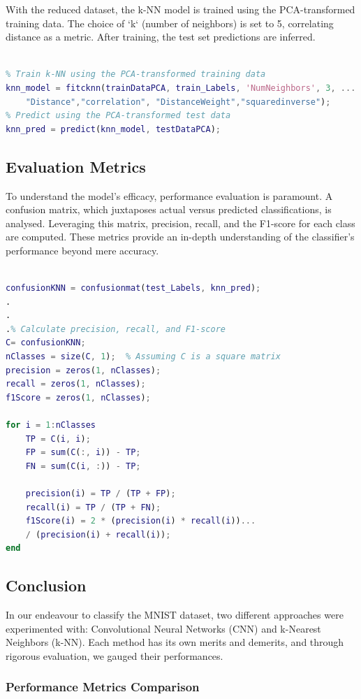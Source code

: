 With the reduced dataset, the k-NN model is trained using the PCA-transformed training data. The choice of `k` (number of neighbors) is set to 5, correlating distance as a metric. After training, the test set predictions are inferred.
\begin{lstlisting}[language=Matlab]

% Train k-NN using the PCA-transformed training data
knn_model = fitcknn(trainDataPCA, train_Labels, 'NumNeighbors', 3, ...
    "Distance","correlation", "DistanceWeight","squaredinverse");
% Predict using the PCA-transformed test data
knn_pred = predict(knn_model, testDataPCA);
\end{lstlisting}
\subsection{Evaluation Metrics}

To understand the model's efficacy, performance evaluation is paramount. A confusion matrix, which juxtaposes actual versus predicted classifications, is analysed. Leveraging this matrix, precision, recall, and the F1-score for each class are computed. These metrics provide an in-depth understanding of the classifier's performance beyond mere accuracy.
\begin{lstlisting}[language=Matlab]

confusionKNN = confusionmat(test_Labels, knn_pred);
.
.
.% Calculate precision, recall, and F1-score
C= confusionKNN;
nClasses = size(C, 1);  % Assuming C is a square matrix
precision = zeros(1, nClasses);
recall = zeros(1, nClasses);
f1Score = zeros(1, nClasses);

for i = 1:nClasses
    TP = C(i, i);
    FP = sum(C(:, i)) - TP;
    FN = sum(C(i, :)) - TP;
    
    precision(i) = TP / (TP + FP);
    recall(i) = TP / (TP + FN);
    f1Score(i) = 2 * (precision(i) * recall(i))...
    / (precision(i) + recall(i));
end
\end{lstlisting}
\subsection{Conclusion}

In our endeavour to classify the MNIST dataset, two different approaches were experimented with: Convolutional Neural Networks (CNN) and k-Nearest Neighbors (k-NN). Each method has its own merits and demerits, and through rigorous evaluation, we gauged their performances.

\subsubsection{Performance Metrics Comparison}

